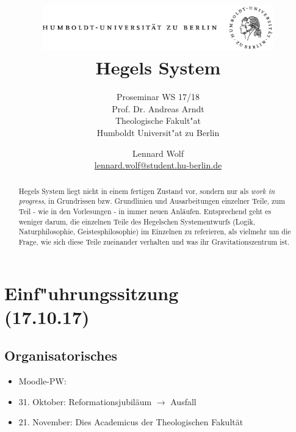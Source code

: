 \documentclass[emulatestandardclasses]{scrartcl}
\date{\vspace{-3ex}}
\begin{document}
\title{
	\includegraphics*[width=0.75\textwidth]{ErstesSem/images/hu_logo.png}\\
	\vspace{24pt}
	Hegels System}
\subtitle{Proseminar WS 17/18\\
          Prof. Dr. Andreas Arndt\\
          Theologische Fakult"at \\ 
          Humboldt Universit"at zu Berlin}
\author{Lennard Wolf\\
        \small{\href{mailto:lennard.wolf@student.hu-berlin.de}{lennard.wolf@student.hu-berlin.de}}}
\maketitle
\begin{abstract}
Hegels System liegt nicht in einem fertigen Zustand vor, sondern nur als \emph{work in progress}, in Grundrissen bzw. Grundlinien und Ausarbeitungen einzelner Teile, zum Teil - wie in den Vorlesungen - in immer neuen Anläufen. Entsprechend geht es weniger darum, die einzelnen Teile des Hegelschen Systementwurfs (Logik, Naturphilosophie, Geistesphilosophie) im Einzelnen zu referieren, als vielmehr um die Frage, wie sich diese Teile zueinander verhalten und was ihr Gravitationszentrum ist.

\end{abstract}
\newpage

\tableofcontents
\listoffigures
\newpage


\section{Einf"uhrungssitzung\\(17.10.17)}

\subsection{Organisatorisches}

\begin{itemize}
  \item Moodle-PW: 
  \item 31. Oktober: Reformationsjubiläum $\rightarrow$ Ausfall
  \item 21. November: Dies Academicus der Theologischen Fakultät
\end{itemize}
\end{document}

